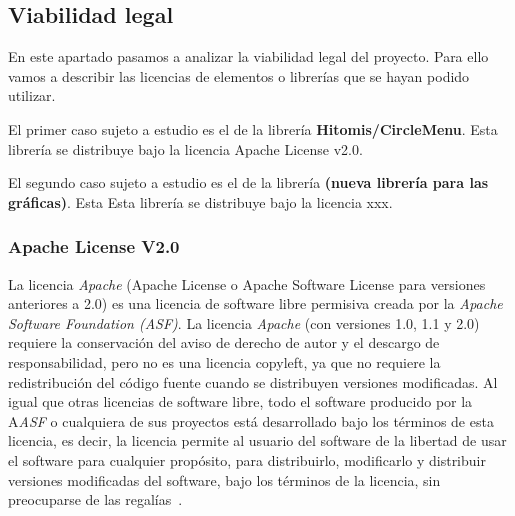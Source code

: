 \subsection{Viabilidad legal}
En este apartado pasamos a analizar la viabilidad legal del proyecto. Para ello vamos a describir las licencias de elementos o librerías que se hayan podido utilizar.

El primer caso sujeto a estudio es el de la librería \textbf{Hitomis/CircleMenu}. Esta librería se distribuye bajo la licencia Apache License v2.0.

El segundo caso sujeto a estudio es el de la librería \textbf{(nueva librería para las gráficas)}. Esta Esta librería se distribuye bajo la licencia xxx.
\subsubsection{Apache License V2.0}
La licencia \textit{Apache} (Apache License o Apache Software License para versiones anteriores a 2.0) es una licencia de software libre permisiva creada por la \textit{Apache Software Foundation (ASF)}. La licencia \textit{Apache} (con versiones 1.0, 1.1 y 2.0) requiere la conservación del aviso de derecho de autor y el descargo de responsabilidad, pero no es una licencia copyleft, ya que no requiere la redistribución del código fuente cuando se distribuyen versiones modificadas.
Al igual que otras licencias de software libre, todo el software producido por la A\textit{ASF} o cualquiera de sus proyectos está desarrollado bajo los términos de esta licencia, es decir, la licencia permite al usuario del software de la libertad de usar el software para cualquier propósito, para distribuirlo, modificarlo y distribuir versiones modificadas del software, bajo los términos de la licencia, sin preocuparse de las regalías~\cite{wiki:apachelicense}.

